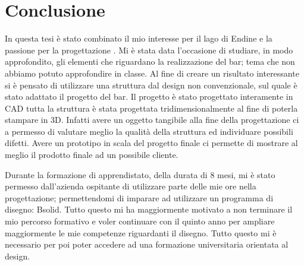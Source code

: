 \section{Conclusione}


In questa tesi è stato combinato il mio interesse per il lago di Endine e la passione per la progettazione . Mi è stata data l’occasione di  studiare, in modo approfondito, gli elementi che riguardano la realizzazione del bar; tema che non abbiamo potuto approfondire in classe. Al fine di creare un risultato interessante si è pensato di utilizzare  una struttura dal design non convenzionale, sul quale è stato adattato il progetto del bar. Il progetto è stato progettato interamente in CAD tutta la struttura è stata progettata tridimensionalmente al fine di poterla stampare in 3D. Infatti avere un oggetto tangibile alla fine della progettazione ci a permesso di valutare meglio la qualità della struttura ed individuare possibili difetti. Avere un prototipo in scala del progetto finale ci permette di mostrare al meglio il prodotto finale ad un possibile cliente.

Durante la formazione di apprendistato, della durata di 8 mesi, mi è stato permesso dall'azienda ospitante di utilizzare parte delle mie ore  nella progettazione; permettendomi  di imparare ad utilizzare un programma di disegno: Bsolid. Tutto questo mi ha maggiormente motivato a non terminare il mio percorso formativo e voler continuare con il quinto anno per ampliare maggiormente le mie competenze riguardanti il disegno. Tutto questo mi è necessario per poi poter accedere ad una formazione universitaria orientata al design. \\

\noindent
\cite{maggioli} ~ \cite{endine} ~ \cite{-_di_-_tecnica_here_2017} \cite{commercio} \cite{decreto}  \cite{design}
\cite{banconemis} \cite{bancone}  \cite{celle}
 \cite{caffe} \cite{decreto2} \cite{acqua} \cite{argine} \cite{documenti} \cite{barriere}

